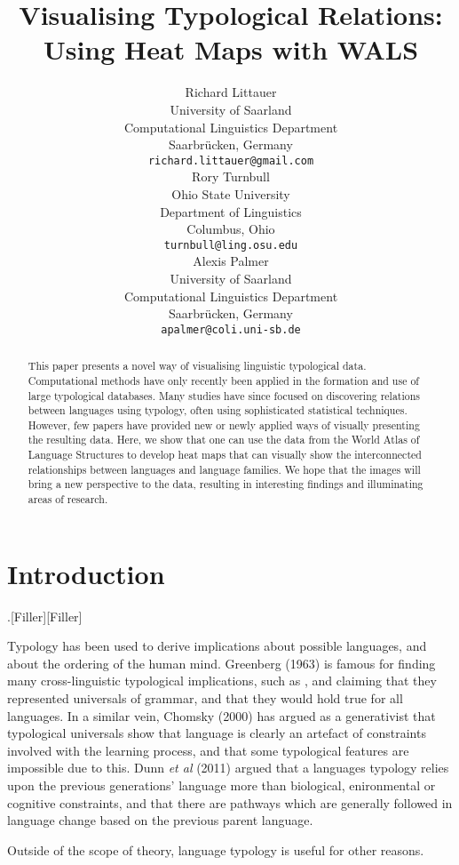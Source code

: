 \documentclass[11pt]{article}
\title{Visualising Typological Relations: Using Heat Maps with WALS}
\author{Richard Littauer \\
University of Saarland\\
Computational Linguistics Department\\
Saarbr\"ucken, Germany\\
  {\tt richard.littauer@gmail.com} \\\And
Rory Turnbull \\
Ohio State University\\
Department of Linguistics\\
Columbus, Ohio\\
  {\tt turnbull@ling.osu.edu} \\\AND
Alexis Palmer\\
University of Saarland\\
Computational Linguistics Department\\
Saarbr\"ucken, Germany\\
  {\tt apalmer@coli.uni-sb.de}\\}
\date{}
\begin{document}
\maketitle
\begin{abstract}
This paper presents a novel way of visualising linguistic typological data. Computational methods have only recently been applied in the formation and use of large typological databases. Many studies have since focused on discovering relations between languages using typology, often using sophisticated statistical techniques. However, few papers have provided new or newly applied ways of visually presenting the resulting data. Here, we show that one can use the data from the World Atlas of Language Structures\cite{wals-2011} to develop heat maps that can visually show the interconnected relationships between languages and language families. We hope that the images will bring a new perspective to the data, resulting in interesting findings and illuminating areas of research.
\end{abstract}


\section{Introduction}
.[Filler][Filler]

Typology has been used to derive implications about possible languages, and about the ordering of the human mind. Greenberg (1963) \nocite{greenberg} is famous for finding many cross-linguistic typological implications, such as %
, and claiming that they represented universals of grammar, and that they would hold true for all languages. In a similar vein, Chomsky (2000) \nocite{chomsky}%
has argued as a generativist that typological universals show that language is clearly an artefact of constraints involved with the learning process, and that some typological features are impossible due to this. Dunn {\it et al} (2011) %
argued that a languages typology relies upon the previous generations' language more than biological, enironmental or cognitive constraints, and that there are pathways which are generally followed in language change based on the previous parent language. 

Outside of the scope of theory, language typology is useful for other reasons. %
\end{document}
